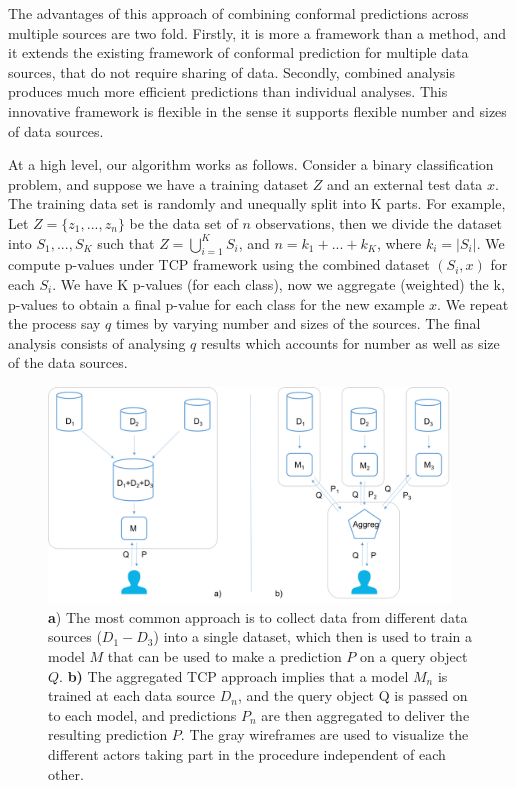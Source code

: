 \documentclass[main]{subfiles}
\begin{document}
The advantages of this approach of combining conformal predictions across multiple sources are two fold. 
Firstly, it is more a framework than a method, and it extends the existing framework of conformal prediction for multiple data sources, that do not require sharing of data. Secondly, combined analysis produces much more efficient predictions than individual analyses. This innovative framework is flexible in the sense it supports flexible number and sizes of data sources.

At a high level, our algorithm works as follows. Consider a binary classification problem, and suppose we have a training dataset $Z$ and an external test data $x$. The training data set is randomly and unequally split into K parts. For example, Let $Z = \{ z_1 , ..., z_n \} $ be the data set of $n$ observations, then we divide the dataset into $S_1, ..., S_K$ such that $Z = \bigcup_{i=1}^K S_i$, and $n = k_1+ ...+k_K$, where $k_i = |S_i|$. We compute p-values under TCP framework using the combined dataset  $(S_i,x)$ for each $S_i$. We have K p-values (for each class), now we aggregate (weighted) the k, p-values to obtain a final p-value for each class for the new example $x$. We repeat the process say $q$ times by varying number and sizes of the sources. The final analysis consists of analysing $q$ results which accounts for number as well as size of the data sources.

\begin{figure}[b!]
    \includegraphics[width=0.95\textwidth]{images/fig-overview.png}
    \caption{\textbf{a}) The most common approach is to collect data from different data sources ($D_1-D_3$) into a single dataset, which then is used to train a model $M$ that can be used to make a prediction $P$ on a query object $Q$. \textbf{b)} The aggregated TCP approach implies that a model $M_n$ is trained at each data source $D_n$, and the query object Q is passed on to each model, and predictions $P_n$ are then aggregated to deliver the resulting prediction $P$. The gray wireframes are used to visualize the different actors taking part in the procedure independent of each other.}
  \label{fig:overview}
\end{figure}
\end{document}
